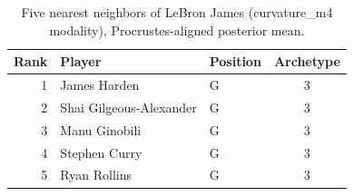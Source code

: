 \begin{table}[htbp]
  \centering\small
  \begin{tabular}{rllc}
    \toprule
    Rank & Player & Position & Archetype \\
    \midrule
    1 & James Harden & G & 3 \\
    2 & Shai Gilgeous-Alexander & G & 3 \\
    3 & Manu Ginobili & G & 3 \\
    4 & Stephen Curry & G & 3 \\
    5 & Ryan Rollins & G & 3 \\
    \bottomrule
  \end{tabular}
  \caption{Five nearest neighbors of LeBron James (curvature_m4 modality), Procrustes-aligned posterior mean.}
  \label{tab:LeBron_James_neighbors_curvature_m4}
\end{table}

